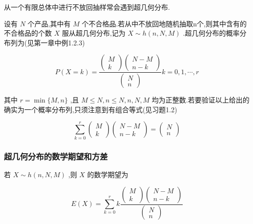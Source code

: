 从一个有限总体中进行不放回抽样常会遇到超几何分布.

设有 $ N $ 个产品,其中有 $ M $ 个不合格品.若从中不放回地随机抽取n个,则其中含有的不合格品的个数 $ X $ 服从超几何分布,记为 $ X \sim h(n, N, M) $ .超几何分布的概率分布列为(见第一章中例1.2.3)

\begin{equation}
P(X=k)=\frac{\left( \begin{array}{c}{M} \\ {k}\end{array}\right) \left( \begin{array}{c}{N-M} \\ {n-k}\end{array}\right)}{\left( \begin{array}{c}{N} \\ {n}\end{array}\right)} k=0,1, \cdots, r \label{eq:2.4.6}
\end{equation}

其中 $ r=\min \{M, n\} $ ,且 $ M \leqslant N, n \leqslant N, n, N, M $ 均为正整数.若要验证以上给出的确实为一个概率分布列,只须注意到有组合等式(见习题1.2)

\[
\sum_{k=0}^{r} \left( \begin{array}{c}{M} \\ {k}\end{array}\right) \left( \begin{array}{c}{N-M} \\ {n-k}\end{array}\right)=\left( \begin{array}{l}{N} \\ {n}\end{array}\right)
\]

\subsubsection{超几何分布的数学期望和方差}

若 $ X \sim h(n, N, M) $ ,则 $ X $ 的数学期望为

\[
E(X)=\sum_{k=0}^{r} k \frac{\left( 
	\begin{array}{c}
	{M} \\ 
	{k}
	\end{array}
	\right) 
	\left( 
	\begin{array}{c}
	{N-M} \\ 
	{n-k}
	\end{array}
	\right)}{\left( 
	\begin{array}{l}
	{N} \\ 
	{n}
	\end{array}
	\right)}
\]

